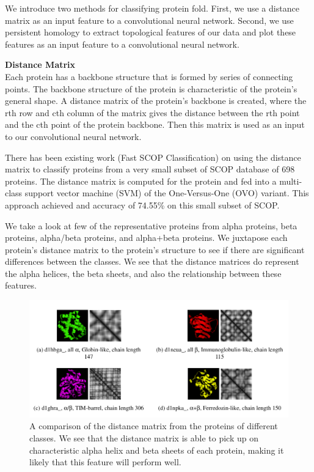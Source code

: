 \documentclass[12pt, a4paper, twocolumn, fullpage]{article}
\theoremstyle{plain}
\theoremstyle{definition}
\theoremstyle{remark}
\begin{document}
We introduce two methods for classifying protein fold. First, we use a distance matrix as an input feature to a convolutional neural network. Second, we use persistent homology to extract topological features of our data and plot these features as an input feature to a convolutional neural network.

\textbf{Distance Matrix} \\
Each protein has a backbone structure that is formed by  series of connecting points. The backbone structure of the protein is characteristic of the protein's general shape. A distance matrix of the protein's backbone is created, where the rth row and cth column of the matrix gives the distance between the rth point and the cth point of the protein backbone. Then this matrix is used as an input to our convolutional neural network.

There has been existing work (Fast SCOP Classification) on using the distance matrix to classify proteins from a very small subset of SCOP database \cite{fastSCOP} of 698 proteins. The distance matrix is computed for the protein and fed into a multi-class support vector machine (SVM) of the One-Versus-One (OVO) variant. This approach achieved and accuracy of 74.55\% on this small subset of SCOP. 

We take a look at few of the representative proteins from alpha proteins, beta proteins, alpha/beta proteins, and alpha+beta proteins. We juxtapose each protein's distance matrix to the protein's structure to see if there are significant differences between the classes. We see that the distance matrices do represent the alpha helices, the beta sheets, and also the relationship between these features.

\begin{figure}
	\centering
    \includegraphics[width=\linewidth]{img/SCOP/scopDistCompare.png}
    \caption{A comparison of the distance matrix from the proteins of different classes. We see that the distance matrix is able to pick up on characteristic alpha helix and beta sheets of each protein, making it likely that this feature will perform well.}
    \label{}
\end{figure}
\end{document}
